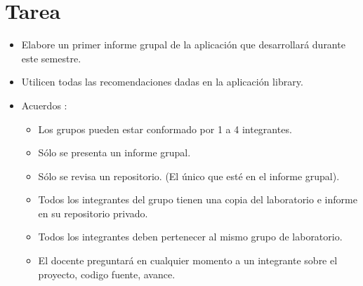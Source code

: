 \documentclass{article}
\begin{document}
    
    \section{Tarea}
    \begin{itemize}
        \item Elabore un primer informe grupal de la aplicación que desarrollará durante este semestre.
        \item Utilicen todas las recomendaciones dadas en la aplicación library.
        \item Acuerdos :
        \begin{itemize}
            \item Los grupos pueden estar conformado por 1 a 4 integrantes.
            \item Sólo se presenta un informe grupal.
            \item Sólo se revisa un repositorio. (El único que esté en el informe grupal).
            \item Todos los integrantes del grupo tienen una copia del laboratorio e informe en su repositorio privado.
            \item Todos los integrantes deben pertenecer al mismo grupo de laboratorio.
            \item El docente preguntará en cualquier momento a un integrante sobre el proyecto, codigo fuente, avance.
        \end{itemize}
    \end{itemize}
\end{document}
